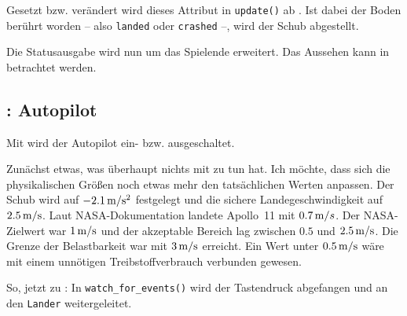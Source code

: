 
Gesetzt bzw. verändert wird dieses Attribut in \texttt{update()} ab . Ist dabei der Boden berührt worden -- also \texttt{landed} oder \texttt{crashed} --, wird der Schub abgestellt.


Die Statusausgabe wird nun um das Spielende erweitert. Das Aussehen kann in  betrachtet werden.




\subsection{: Autopilot}

	Mit  wird der Autopilot ein- bzw. ausgeschaltet.
\er

Zunächst etwas, was überhaupt nichts mit  zu tun hat. Ich möchte, dass sich die physikalischen Größen noch etwas mehr den tatsächlichen Werten anpassen. Der Schub wird auf $\unit[-2.1]{m/s^2}$ festgelegt und die sichere Landegeschwindigkeit auf $\unit[2.5]{m/s}$. Laut NASA-Dokumentation landete Apollo~11 mit $\unit[0.7]m/s$. Der NASA-Zielwert war $\unit[1]{m/s}$ und der akzeptable Bereich lag zwischen $0.5$ und $\unit[2.5]{m/s}$. Die Grenze der Belastbarkeit war mit $\unit[3]{m/s}$ erreicht. Ein Wert unter $\unit[0.5]{m/s}$ wäre mit einem unnötigen Treibstoffverbrauch verbunden gewesen.


So, jetzt zu : In \texttt{watch\_for\_events()} wird der Tastendruck  abgefangen und an den \texttt{Lander} weitergeleitet.

\newpage
{} 


